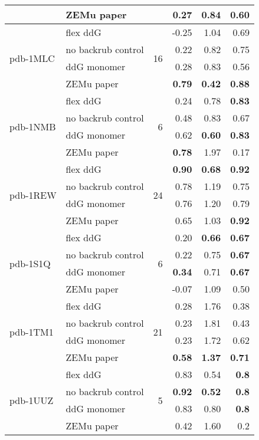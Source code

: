 {\begin{longtable}{llrrrr}
 & ZEMu paper & & 0.27 & 0.84 & 0.60  \\
\hline
 \multirow{ 4}{*}{pdb-1MLC} & flex ddG & \multirow{ 4}{*}{16} & -0.25 & 1.04 & 0.69  \\
 & no backrub control & & 0.22 & 0.82 & 0.75  \\
 & ddG monomer & & 0.28 & 0.83 & 0.56  \\
 & ZEMu paper & & \textbf{0.79} & \textbf{0.42} & \textbf{0.88}  \\
\hline
 \multirow{ 4}{*}{pdb-1NMB} & flex ddG & \multirow{ 4}{*}{6} & 0.24 & 0.78 & \textbf{0.83}  \\
 & no backrub control & & 0.48 & 0.83 & 0.67  \\
 & ddG monomer & & 0.62 & \textbf{0.60} & \textbf{0.83}  \\
 & ZEMu paper & & \textbf{0.78} & 1.97 & 0.17  \\
\hline
 \multirow{ 4}{*}{pdb-1REW} & flex ddG & \multirow{ 4}{*}{24} & \textbf{0.90} & \textbf{0.68} & \textbf{0.92}  \\
 & no backrub control & & 0.78 & 1.19 & 0.75  \\
 & ddG monomer & & 0.76 & 1.20 & 0.79  \\
 & ZEMu paper & & 0.65 & 1.03 & \textbf{0.92}  \\
\hline
 \multirow{ 4}{*}{pdb-1S1Q} & flex ddG & \multirow{ 4}{*}{6} & 0.20 & \textbf{0.66} & \textbf{0.67}  \\
 & no backrub control & & 0.22 & 0.75 & \textbf{0.67}  \\
 & ddG monomer & & \textbf{0.34} & 0.71 & \textbf{0.67}  \\
 & ZEMu paper & & -0.07 & 1.09 & 0.50  \\
\hline
 \multirow{ 4}{*}{pdb-1TM1} & flex ddG & \multirow{ 4}{*}{21} & 0.28 & 1.76 & 0.38  \\
 & no backrub control & & 0.23 & 1.81 & 0.43  \\
 & ddG monomer & & 0.23 & 1.72 & 0.62  \\
 & ZEMu paper & & \textbf{0.58} & \textbf{1.37} & \textbf{0.71}  \\
\hline
 \multirow{ 4}{*}{pdb-1UUZ} & flex ddG & \multirow{ 4}{*}{5} & 0.83 & 0.54 & \textbf{0.8}  \\
 & no backrub control & & \textbf{0.92} & \textbf{0.52} & \textbf{0.8}  \\
 & ddG monomer & & 0.83 & 0.80 & \textbf{0.8}  \\
 & ZEMu paper & & 0.42 & 1.60 & 0.2  \\

\end{longtable}}
